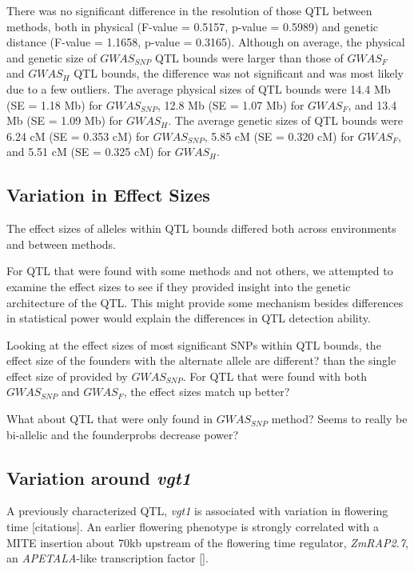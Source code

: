 \documentclass[article,9pt,twocolumn,twoside]{rilabRxiv}
\begin{document}
There was no significant difference in the resolution of those QTL between methods, both in physical (F-value = 0.5157, p-value = 0.5989) and genetic distance (F-value = 1.1658, p-value = 0.3165). Although on average, the physical and genetic size of $GWAS_{SNP}$ QTL bounds were larger than those of $GWAS_F$ and $GWAS_H$ QTL bounds, the difference was not significant and was most likely due to a few outliers. The average physical sizes of QTL bounds were 14.4 Mb (SE = 1.18 Mb) for $GWAS_{SNP}$, 12.8 Mb (SE = 1.07 Mb) for $GWAS_F$, and 13.4 Mb (SE = 1.09 Mb) for $GWAS_H$. The average genetic sizes of QTL bounds were 6.24 cM (SE = 0.353 cM) for $GWAS_{SNP}$, 5.85 cM (SE = 0.320 cM) for $GWAS_F$, and 5.51 cM (SE = 0.325 cM) for $GWAS_H$.

\subsection{Variation in Effect Sizes}
The effect sizes of alleles within QTL bounds differed both across environments and between methods.

For QTL that were found with some methods and not others, we attempted to examine the effect sizes to see if they provided insight into the genetic architecture of the QTL. This might provide some mechanism besides differences in statistical power would explain the differences in QTL detection ability.

Looking at the effect sizes of most significant SNPs within QTL bounds, the effect size of the founders with the alternate allele are different? than the single effect size of provided by $GWAS_{SNP}$. For QTL that were found with both $GWAS_{SNP}$ and $GWAS_F$, the effect sizes match up better?

What about QTL that were only found in $GWAS_{SNP}$ method? Seems to really be bi-allelic and the founderprobs decrease power?



\subsection{Variation around \emph{vgt1}}
A previously characterized QTL, \emph{vgt1} is associated with variation in flowering time [citations]. An earlier flowering phenotype is strongly correlated with a MITE insertion about 70kb upstream of the flowering time regulator, \emph{ZmRAP2.7}, an \emph{APETALA}-like transcription factor [].
\end{document}
